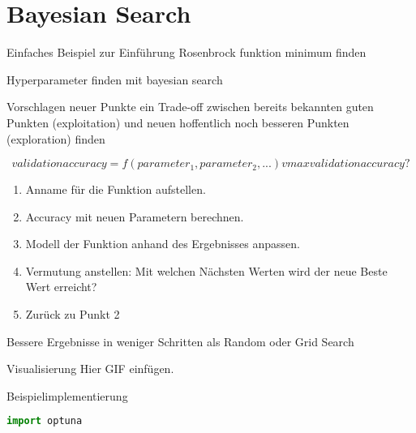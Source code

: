 \section{Bayesian Search}


\begin{frame}{Einfaches Beispiel zur Einführung}
    Rosenbrock funktion minimum finden
\end{frame}


\begin{frame}[allowframebreaks]{Hyperparameter finden mit bayesian search}

Vorschlagen neuer Punkte ein Trade-off zwischen bereits bekannten guten Punkten (exploitation) und neuen hoffentlich noch besseren Punkten (exploration) finden

\begin{equation}
    validation accuracy = f (parameter_1, parameter_2, ...)
    vmax validation accuracy ?
\end{equation}

\begin{enumerate}
    \item Anname für die Funktion aufstellen.
    \item Accuracy mit neuen Parametern berechnen.
    \item Modell der Funktion anhand des Ergebnisses anpassen.
    \item Vermutung anstellen: Mit welchen Nächsten Werten wird der neue Beste Wert erreicht?
    \item Zurück zu Punkt 2
\end{enumerate}

Bessere Ergebnisse in weniger Schritten als Random oder Grid Search
    
\end{frame}


\begin{frame}{Visualisierung}
    Hier GIF einfügen.
\end{frame}


\begin{frame}[fragile]{Beispielimplementierung}
\begin{lstlisting}[language=Python]
import optuna
\end{lstlisting}
\end{frame}